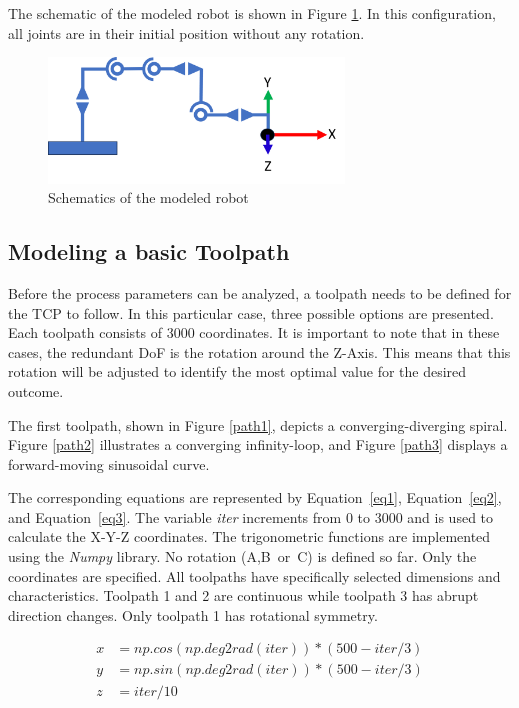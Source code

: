 The schematic of the modeled robot is shown in Figure \ref{schema}. In this configuration, all joints are in their initial position without any rotation.
\begin{figure}[H]
	\centerline{\includegraphics[width=0.7\textwidth]{figures/schema.png}}
	\caption{Schematics of the modeled robot}
	\label{schema}
\end{figure}

\subsection{Modeling a basic Toolpath}\label{MBT}
Before the process parameters can be analyzed, a toolpath needs to be defined for the TCP to follow. In this particular case, three possible options are presented. Each toolpath consists of 3000 coordinates. It is important to note that in these cases, the redundant DoF is the rotation around the Z-Axis. This means that  this rotation will be adjusted to identify the most optimal value for the desired outcome.


The first toolpath, shown in Figure \ref{path1}, depicts a converging-diverging spiral. Figure \ref{path2} illustrates a converging infinity-loop, and Figure \ref{path3} displays a forward-moving sinusoidal curve. 

The corresponding equations are represented by Equation~\ref{eq1}, Equation~\ref{eq2}, and Equation~\ref{eq3}. The variable \textit{iter} increments from 0 to 3000 and is used to calculate the X-Y-Z coordinates. The trigonometric functions are implemented using the \textit{Numpy} library. No rotation (A,B~or~C) is defined so far. Only the coordinates are specified. All toolpaths have specifically selected dimensions and characteristics. Toolpath 1 and 2 are continuous while toolpath 3 has abrupt direction changes. Only toolpath 1 has rotational symmetry. 


\begin{equation}\label{eq1}
\begin{split}
x &= np.cos(np.deg2rad(iter)) * (500 - iter / 3)\\
y &= np.sin(np.deg2rad(iter)) * (500 - iter / 3)\\
z &= iter / 10
\end{split}
\end{equation}


